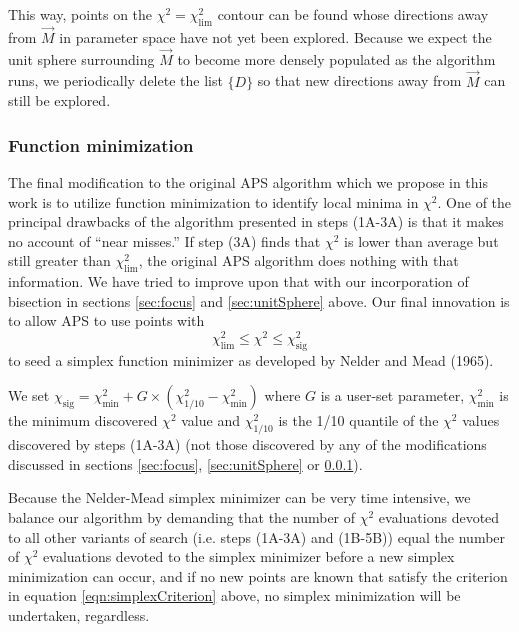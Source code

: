 \documentclass[useAMS,usenatbib]{aastex}
\begin{document}
This way, points on the $\chi^2=\chi^2_\text{lim}$ contour can be found whose
directions away from $\vec{M}$ in parameter space have not yet been explored.
Because we expect the unit sphere surrounding $\vec{M}$ to become more densely
populated as the algorithm runs, we periodically delete the list $\{D\}$ so that
new directions away from $\vec{M}$ can still be explored.

\subsubsection{Function minimization}
\label{sec:simplex}

The final modification to the original APS algorithm which we propose in this
work is to utilize function minimization to identify local minima in $\chi^2$.
One of the principal drawbacks of the algorithm presented in steps (1A-3A) is
that it makes no account of ``near misses.''  If step (3A) finds that $\chi^2$
is lower than average but still greater than $\chi^2_\text{lim}$, the original
APS algorithm does nothing with that information.  We have tried to improve upon
that with our incorporation of bisection in sections \ref{sec:focus} and
\ref{sec:unitSphere} above.  Our final innovation is to allow APS to use points
with 
\begin{equation}
\label{eqn:simplexCriterion}
\chi^2_\text{lim}\le\chi^2\le\chi^2_\text{sig}
\end{equation}
to seed a simplex function minimizer as developed by Nelder and Mead (1965).

We set
$\chi_\text{sig}=\chi^2_\text{min}+G\times(\chi^2_{1/10}-\chi^2_\text{min})$
where $G$ is a user-set parameter, $\chi^2_\text{min}$ is the minimum discovered
$\chi^2$ value and $\chi^2_{1/10}$ is the 1/10 quantile of the $\chi^2$ values
discovered by steps (1A-3A) (not those discovered by any of the modifications
discussed in sections \ref{sec:focus}, \ref{sec:unitSphere} or
\ref{sec:simplex}).

Because the Nelder-Mead simplex minimizer can be very time intensive, we balance our
algorithm by demanding that the number of $\chi^2$ evaluations devoted to all
other variants of search (i.e. steps (1A-3A) and (1B-5B)) equal the number of
$\chi^2$ evaluations devoted to the simplex minimizer before a new simplex
minimization can occur, and if no new points are known that satisfy the
criterion in equation \ref{eqn:simplexCriterion} above, no simplex minimization
will be undertaken, regardless.
\end{document}
